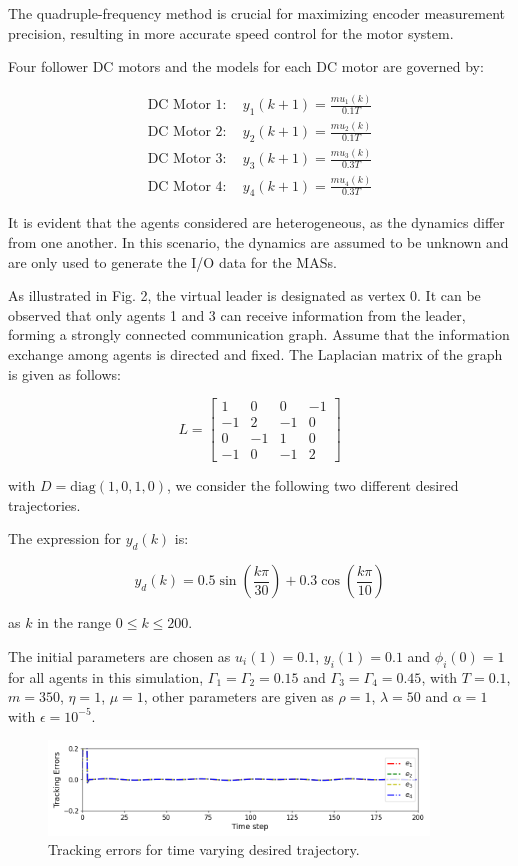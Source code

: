 \documentclass[journal,onecolumn]{IEEEtran}
\begin{document}
The quadruple-frequency method is crucial for maximizing encoder measurement precision, resulting in more accurate speed control for the motor system.

Four follower DC motors and the models for each DC motor are governed by:

\[
\begin{array}{c}
\text{DC Motor 1}: \quad y_1(k+1) = \frac{m u_1(k)}{0.1 T}\\
\text{DC Motor 2}: \quad y_2(k+1) = \frac{m u_2(k)}{0.1 T } \\
\text{DC Motor 3}: \quad y_3(k+1) = \frac{m u_3(k)}{0.3 T } \\
\text{DC Motor 4}: \quad y_4(k+1) = \frac{m u_4(k)}{0.3 T } 
\end{array}
\]


It is evident that the agents considered are heterogeneous, as the dynamics differ from one another. In this scenario, the dynamics are assumed to be unknown and are only used to generate the I/O data for the MASs. 

As illustrated in Fig. 2, the virtual leader is designated as vertex 0. It can be observed that only agents 1 and 3 can receive information from the leader, forming a strongly connected communication graph. Assume that the information exchange among agents is directed and fixed. The Laplacian matrix of the graph is given as follows:

\[
    L = \begin{bmatrix}
    1 & 0 & 0 & -1 \\
    -1 & 2 & -1 & 0 \\
    0 & -1 & 1 & 0 \\
    -1 & 0 & -1 & 2
    \end{bmatrix}
\]

with \( D = \text{diag}(1, 0, 1, 0) \), we consider the following two different desired trajectories.




The expression for \( y_d(k) \) is:

\[
y_d(k) = 0.5 \sin\left(\frac{k \pi}{30}\right) + 0.3  \cos\left(\frac{k \pi}{10}\right)
\]

as \( k \) in the range \( 0 \leq k \leq 200 \).

The initial parameters are chosen as \(u_i(1)=0.1\), \(y_i(1)=0.1\) and \(\phi_i(0)=1 \) for all agents in this simulation, \(\Gamma_{1}=\Gamma_{2}=0.15\) and \(\Gamma_{3}=\Gamma_{4}=0.45\), with \(T=0.1\), \(m=350\), \(\eta=1\), \(\mu=1\), other parameters are given as \(\rho=1\), \(\lambda=50\) and \(\alpha=1\) with \(\epsilon=10^{-5}\).
\begin{figure}[H]
    \centering
    \includegraphics[width=0.9\textwidth]{Figure_2.png}
    \caption{Tracking errors for time varying desired trajectory.}
    \label{fig:figure_2} %
\end{figure}
\end{document}
